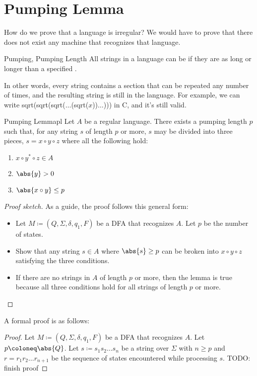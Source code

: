 \documentclass[12pt]{report}
\begin{document}
\section{Pumping Lemma}
How do we prove that a language is irregular? We would have to prove that there does not exist any machine that recognizes that language.

\begin{dfnbox}{Pumping, Pumping Length}{}
    All strings in a language can be  if they are as long or longer than a specified .
\end{dfnbox}

In other words, every string contains a section that can be repeated any number of times, and the resulting string is still in the language. For example, we can write sqrt(sqrt(sqrt($\ldots$(sqrt($x$))$\ldots$))) in C, and it's still valid.

\begin{thmbox}{Pumping Lemma}{pl}
    Let $A$ be a regular language. There exists a pumping length $p$ such that, for any string $s$ of length $p$ or more, $s$ may be divided into three pieces, $s = x \circ y \circ z$ where all the following hold:
    \begin{enumerate}[noitemsep]
        \item $x \circ y^* \circ z \in A$
        \item $\abs{y} > 0$
        \item $\abs{x \circ y} \leq p$
    \end{enumerate}
    \tcblower
    \begin{proof}[Proof sketch]
        As a guide, the proof follows this general form:
        \begin{itemize}[noitemsep]
            \item Let $M \coloneq (Q, \Sigma, \delta, q_1, F)$ be a DFA that recognizes $A$. Let $p$ be the number of states.
            \item Show that any string $s \in A$ where $\abs{s} \geq p$ can be broken into $x \circ y \circ z$ satisfying the three conditions.
            \item If there are no strings in $A$ of length $p$ or more, then the lemma is true because all three conditions hold for all strings of length $p$ or more.
        \end{itemize}
    \end{proof}

    A formal proof is as follows:
    \begin{proof}
        Let $M \coloneq  (Q, \Sigma, \delta, q_1, F)$ be a DFA that recognizes $A$. Let $p \coloneq \abs{Q}$. Let $s \coloneq s_1 s_2 \ldots s_n$ be a string over $\Sigma$ with $n \geq p$ and $r = r_1 r_2 \ldots r_{n+1}$ be the sequence of states encountered while processing $s$.
        TODO: finish proof
    \end{proof}
\end{thmbox}
\end{document}
